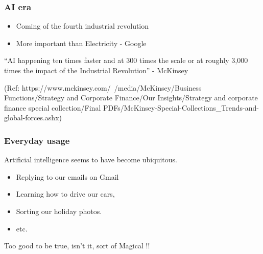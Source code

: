 

\begin{frame}[fragile]\frametitle{AI era}
\begin{itemize}
\item Coming of the fourth industrial revolution
\item More important than Electricity - Google
\end{itemize}

``AI happening ten times faster and at 300 times the scale or at roughly 3,000 times the impact of the Industrial Revolution'' - McKinsey

{\tiny (Ref: https://www.mckinsey.com/~/media/McKinsey/Business Functions/Strategy and Corporate Finance/Our Insights/Strategy and corporate finance special collection/Final PDFs/McKinsey-Special-Collections\_Trends-and-global-forces.ashx)}
\end{frame}



\begin{frame}[fragile]\frametitle{Everyday usage}
Artificial intelligence seems to have become ubiquitous.
\begin{itemize}
\item Replying to our emails on Gmail
\item Learning how to drive our cars,
\item Sorting our holiday photos.
\item etc.
\end{itemize}
Too good to be true, isn't it, sort of Magical !!
\end{frame}

